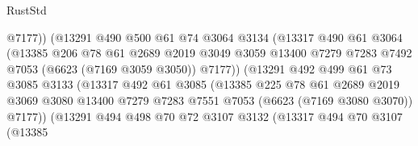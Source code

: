 \begin{lexlean}{RustStd}
\begin{coremodule}
                                @7177))
                            (@13291
                              @490
                              @500
                              @61
                              @74
                              @3064
                              @3134
                              (@13317
                                @490
                                @61
                                @3064
                                (@13385
                                  @206
                                  @78
                                  @61
                                  @2689
                                  @2019
                                  @3049
                                  @3059
                                  @13400
                                  @7279
                                  @7283
                                  @7492
                                  @7053
                                  (@6623 (@7169 @3059 @3050))
                                  @7177))
                              (@13291
                                @492
                                @499
                                @61
                                @73
                                @3085
                                @3133
                                (@13317
                                  @492
                                  @61
                                  @3085
                                  (@13385
                                    @225
                                    @78
                                    @61
                                    @2689
                                    @2019
                                    @3069
                                    @3080
                                    @13400
                                    @7279
                                    @7283
                                    @7551
                                    @7053
                                    (@6623 (@7169 @3080 @3070))
                                    @7177))
                                (@13291
                                  @494
                                  @498
                                  @70
                                  @72
                                  @3107
                                  @3132
                                  (@13317
                                    @494
                                    @70
                                    @3107
                                    (@13385

\end{coremodule}
\end{lexlean}

